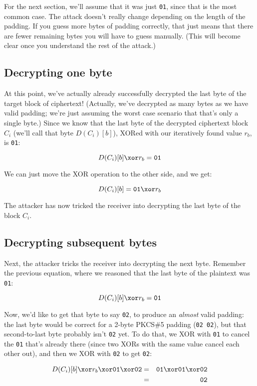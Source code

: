 \documentclass[11pt,ebook,table,dvipsnames]{memoir}
\begin{document}
For the next section, we'll assume that it was just \verb~01~, since that
is the most common case. The attack doesn't really change depending on
the length of the padding. If you guess more bytes of padding
correctly, that just means that there are fewer remaining bytes you
will have to guess manually. (This will become clear once you
understand the rest of the attack.)
\subsection{Decrypting one byte}
\label{sec-2-3-9-3}

At this point, we've actually already successfully decrypted the last
byte of the target block of ciphertext! (Actually, we've decrypted as
many bytes as we have valid padding; we're just assuming the worst
case scenario that that's only a single byte.) Since we know that the
last byte of the decrypted ciphertext block $C_i$ (we'll call that
byte $D(C_i)[b]$), XORed with our iteratively found value $r_b$, is
\verb|01|:

\[
D(C_i)[b] \xor r_b = \mathtt{01}
\]

We can just move the XOR operation to the other side, and we get:

\[
D(C_i)[b] = \mathtt{01} \xor r_b
\]

The attacker has now tricked the receiver into decrypting the last
byte of the block $C_i$.
\subsection{Decrypting subsequent bytes}
\label{sec-2-3-9-4}

Next, the attacker tricks the receiver into decrypting the next byte.
Remember the previous equation, where we reasoned that the last byte
of the plaintext was \verb~01~:

\[
D(C_i)[b] \xor r_b = \mathtt{01}
\]

Now, we'd like to get that byte to say \verb~02~, to produce an \emph{almost}
valid padding: the last byte would be correct for a 2-byte PKCS\#5
padding (\verb~02 02~), but that second-to-last byte probably isn't \verb~02~
yet. To do that, we XOR with \verb~01~ to cancel the \verb~01~ that's already
there (since two XORs with the same value cancel each other out), and
then we XOR with \verb~02~ to get \verb~02~:

\begin{eqnarray*}
D(C_i)[b] \xor r_b \xor \mathtt{01} \xor \mathtt{02} & = & \mathtt{01} \xor \mathtt{01} \xor \mathtt{02} \\
& = & \mathtt{02}
\end{eqnarray*}
\end{document}
